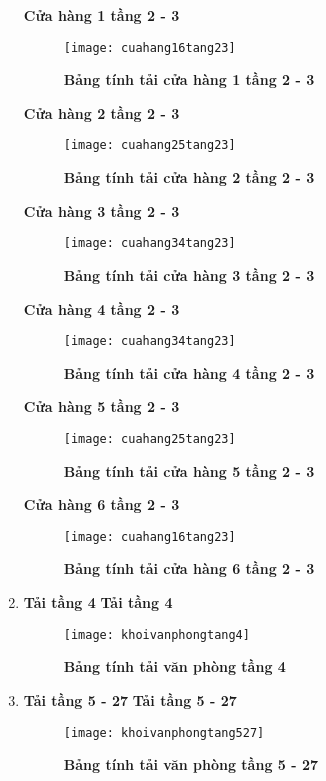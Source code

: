\begin{enumerate}
\textbf{Cửa hàng 1 tầng 2 - 3  }
\begin{figure}[H]
	\centering
	\texttt{[image: cuahang16tang23]}
	\caption{\textbf{Bảng tính tải cửa hàng 1 tầng 2 - 3}}
	\label{cuahang1}
\end{figure}

\textbf{Cửa hàng 2 tầng 2 - 3  }
\begin{figure}[H]
	\centering
	\texttt{[image: cuahang25tang23]}
	\caption{\textbf{Bảng tính tải cửa hàng 2 tầng 2 - 3}}
	\label{cuahang2}
\end{figure}

\textbf{Cửa hàng 3 tầng 2 - 3  }
\begin{figure}[H]
	\centering
	\texttt{[image: cuahang34tang23]}
	\caption{\textbf{Bảng tính tải cửa hàng 3 tầng 2 - 3}}
	\label{cuahang3}
\end{figure}

\textbf{Cửa hàng 4 tầng 2 - 3  }
\begin{figure}[H]
	\centering
	\texttt{[image: cuahang34tang23]}
	\caption{\textbf{Bảng tính tải cửa hàng 4 tầng 2 - 3}}
	\label{cuahang4}
\end{figure}

\textbf{Cửa hàng 5 tầng 2 - 3  }
\begin{figure}[H]
	\centering
	\texttt{[image: cuahang25tang23]}
	\caption{\textbf{Bảng tính tải cửa hàng 5 tầng 2 - 3}}
	\label{cuahang5}
\end{figure}

\textbf{Cửa hàng 6 tầng 2 - 3  }
\begin{figure}[H]
	\centering
	\texttt{[image: cuahang16tang23]}
	\caption{\textbf{Bảng tính tải cửa hàng 6 tầng 2 - 3}}
	\label{cuahang6}
\end{figure}

\newpage
\item{\textbf{Tải tầng 4}}
\textbf{Tải tầng 4 }
\begin{figure}[H]
	\centering
	\texttt{[image: khoivanphongtang4]}
	\caption{\textbf{Bảng tính tải văn phòng tầng 4}}
	\label{vanphongtang4}
\end{figure}

\item{\textbf{Tải tầng 5 - 27}}
\textbf{Tải tầng 5 - 27 }
\begin{figure}[H]
	\centering
	\texttt{[image: khoivanphongtang527]}
	\caption{\textbf{Bảng tính tải văn phòng tầng 5 - 27}}
	\label{vanphongtang527}
\end{figure}

\end{enumerate}
